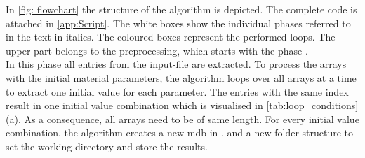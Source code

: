 \indent In \autoref{fig: flowchart} the structure of the algorithm is depicted. The complete code is attached in \autoref{app:Script}. The white boxes show the individual phases referred to in the text in italics. The coloured boxes represent the performed loops. 
The upper part belongs to the preprocessing, which starts with the phase . \\
\indent In this phase all entries from the input-file are extracted. 
To process the arrays with the initial material parameters, the algorithm loops over all arrays at a time to extract one initial value for each parameter.
The entries with the same index result in one initial value combination which is visualised in \autoref{tab:loop_conditions} (a).
As a consequence, all arrays need to be of same length. For every initial value combination, the algorithm creates a new \acrfull{mdb} in , and a new folder structure to set the working directory and store the results.

